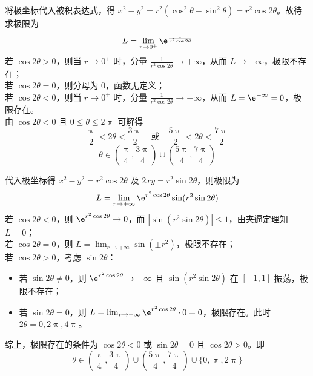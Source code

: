 \begin{solution}

    将极坐标代入被积表达式，得 $x^2 - y^2 = r^2(\cos^2 \theta - \sin^2 \theta) = r^2 \cos 2\theta$。故待求极限为
    \begin{equation}
        L = \lim_{r \to 0^+} \e^{\frac{1}{r^2 \cos 2\theta}}
    \end{equation}
    若 $\cos 2\theta > 0$，则当 $r \to 0^+$ 时，分量 $\frac{1}{r^2 \cos 2\theta} \to +\infty$，从而 $L \to +\infty$，极限不存在；\\
    若 $\cos 2\theta = 0$，则分母为 $0$，函数无定义；\\
    若 $\cos 2\theta < 0$，则当 $r \to 0^+$ 时，分量 $\frac{1}{r^2 \cos 2\theta} \to -\infty$，从而 $L = \e^{-\infty} = 0$，极限存在。\\
    由 $\cos 2\theta < 0$ 且 $0 \leqslant \theta \leqslant 2\uppi$ 可解得
    \begin{equation}
        \frac{\uppi}{2} < 2\theta < \frac{3\uppi}{2} \quad \text{或} \quad \frac{5\uppi}{2} < 2\theta < \frac{7\uppi}{2}
    \end{equation}
    \begin{equation}
        \boxed{\theta \in \left( \frac{\uppi}{4}, \frac{3\uppi}{4} \right) \cup \left( \frac{5\uppi}{4}, \frac{7\uppi}{4} \right)}
    \end{equation}


    代入极坐标得 $x^2 - y^2 = r^2 \cos 2\theta$ 及 $2xy = r^2 \sin 2\theta$，则极限为
    \begin{equation}
        L = \lim_{r \to +\infty} \e^{r^2 \cos 2\theta} \sin(r^2 \sin 2\theta)
    \end{equation}
    若 $\cos 2\theta < 0$，则 $\e^{r^2 \cos 2\theta} \to 0$，而 $|\sin(r^2 \sin 2\theta)| \leqslant 1$，由夹逼定理知 $L = 0$；\\
    若 $\cos 2\theta = 0$，则 $L = \lim_{r \to +\infty} \sin(\pm r^2)$，极限不存在；\\
    若 $\cos 2\theta > 0$，考虑 $\sin 2\theta$：
    \begin{itemize}
        \item 若 $\sin 2\theta \neq 0$，则 $\e^{r^2 \cos 2\theta} \to +\infty$ 且 $\sin(r^2 \sin 2\theta)$ 在 $[-1, 1]$ 振荡，极限不存在；
        \item 若 $\sin 2\theta = 0$，则 $L = \lim_{r \to +\infty} \e^{r^2 \cos 2\theta} \cdot 0 = 0$，极限存在。此时 $2\theta = 0, 2\uppi, 4\uppi$。
    \end{itemize}
    综上，极限存在的条件为 $\cos 2\theta < 0$ 或 $\sin 2\theta = 0$ 且 $\cos 2\theta > 0$。即
    \begin{equation}
        \boxed{\theta \in \left( \frac{\uppi}{4}, \frac{3\uppi}{4} \right) \cup \left( \frac{5\uppi}{4}, \frac{7\uppi}{4} \right) \cup \{0, \uppi, 2\uppi\}}
    \end{equation}
\end{solution}


